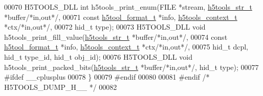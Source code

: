 \begin{DoxyCode}
00070 H5TOOLS\_DLL \textcolor{keywordtype}{int}     h5tools\_print\_enum(FILE *stream, \hyperlink{structh5tools__str__t}{h5tools\_str\_t} *buffer\textcolor{comment}{/*in,out*/},
00071                             \textcolor{keyword}{const} \hyperlink{structh5tool__format__t}{h5tool\_format\_t} *info, 
      \hyperlink{structh5tools__context__t}{h5tools\_context\_t} *ctx\textcolor{comment}{/*in,out*/},
00072                             hid\_t type);
00073 H5TOOLS\_DLL \textcolor{keywordtype}{void}    h5tools\_print\_fill\_value(\hyperlink{structh5tools__str__t}{h5tools\_str\_t} *buffer\textcolor{comment}{/*in,out*/},
00074                             \textcolor{keyword}{const} \hyperlink{structh5tool__format__t}{h5tool\_format\_t} *info, 
      \hyperlink{structh5tools__context__t}{h5tools\_context\_t} *ctx\textcolor{comment}{/*in,out*/}, 
00075                             hid\_t dcpl, hid\_t type\_id, hid\_t obj\_id);
00076 H5TOOLS\_DLL \textcolor{keywordtype}{void}    h5tools\_print\_packed\_bits(\hyperlink{structh5tools__str__t}{h5tools\_str\_t} *buffer\textcolor{comment}{/*in,out*/}, hid\_t type);
00077 \textcolor{preprocessor}{#ifdef \_\_cplusplus}
00078 \}
00079 \textcolor{preprocessor}{#endif}
00080 
00081 \textcolor{preprocessor}{#endif }\textcolor{comment}{/* H5TOOLS\_DUMP\_H\_\_ */}\textcolor{preprocessor}{}
00082 
\end{DoxyCode}
